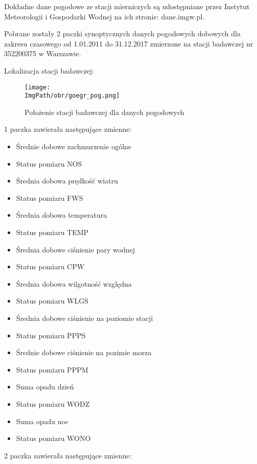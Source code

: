 \documentclass[a4paper,12pt,twoside,openany]{report}
\newcommand{\ImgPath}{.}
\begin{document}
Dokładne dane pogodowe ze stacji mierniczych są udostępniane przez Instytut Meteorologii i Gospodarki Wodnej na ich stronie: dane.imgw.pl.

Pobrane zostały 2 paczki synoptycznych danych pogodowych dobowych dla zakresu czasowego od 1.01.2011 do 31.12.2017 zmierzone na stacji badawczej nr 352200375 w Warszawie.

Lokalizacja stacji badawczej:

\begin{figure}[H]
	\begin{center}
		\centering
		\texttt{[image: \\ImgPath/obr/goegr\_pog.png]}
	\end{center}
	\caption{Położenie stacji badawczej dla danych pogodowych}
	\label{geogr_stacja}
\end{figure}

1 paczka zawierała następujące zmienne:

\begin{itemize}
	\item Średnie dobowe zachmurzenie ogólne
	\item Status pomiaru NOS
	\item Średnia dobowa prędkość wiatru
	\item Status pomiaru FWS
	\item Średnia dobowa temperatura
	\item Status pomiaru TEMP
	\item Średnia dobowe ciśnienie pary wodnej
	\item Status pomiaru CPW
	\item Średnia dobowa wilgotność względna
	\item Status pomiaru WLGS
	\item Średnia dobowe ciśnienie na poziomie stacji
	\item Status pomiaru PPPS
	\item Średnie dobowe ciśnienie na pozimie morza
	\item Status pomiaru PPPM
	\item Suma opadu dzień
	\item Status pomiaru WODZ
	\item Suma opadu noc
	\item Status pomiaru WONO
\end{itemize}

2 paczka zawierała następujące zmienne:
\end{document}
